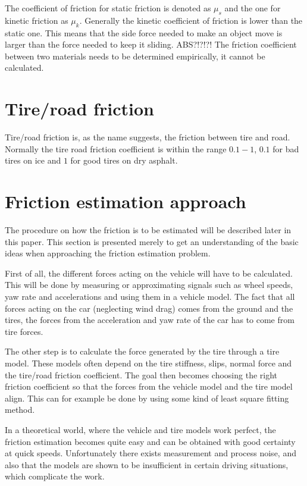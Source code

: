 The coefficient of friction for static friction is denoted as $ \mu_{s} $ and the one for kinetic friction as $ \mu_{k} $. Generally the kinetic coefficient of friction is lower than the static one. This means that the side force needed to make an object move is larger than the force needed to keep it sliding. ABS?!?!?! The friction coefficient between two materials needs to be determined empirically, it cannot be calculated. 

\section{Tire/road friction}
Tire/road friction is, as the name suggests, the friction between tire and road. Normally the tire road friction coefficient is within the range $ 0.1 - 1 $, $ 0.1 $ for bad tires on ice and $ 1 $ for good tires on dry asphalt. 

\section{Friction estimation approach}

The procedure on how the friction is to be estimated will be described later in this paper. This section is presented merely to get an understanding of the basic ideas when approaching the friction estimation problem.

First of all, the different forces acting on the vehicle will have to be calculated. This will be done by measuring or approximating signals such as wheel speeds, yaw rate and accelerations and using them in a vehicle model. The fact that all forces acting on the car (neglecting wind drag) comes from the ground and the tires, the forces from the acceleration and yaw rate of the car has to come from tire forces. 

The other step is to calculate the force generated by the tire through a tire model. These models often depend on the tire stiffness, slips, normal force and the tire/road friction coefficient. The goal then becomes choosing the right friction coefficient so that the forces from the vehicle model and the tire model align. This can for example be done by using some kind of least square fitting method. 

In a theoretical world, where the vehicle and tire models work perfect, the friction estimation becomes quite easy and can be obtained with good certainty at quick speeds. Unfortunately there exists measurement and process noise, and also that the models are shown to be insufficient in certain driving situations, which complicate the work.

